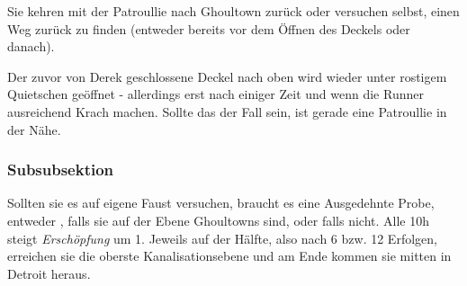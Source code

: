 Sie kehren mit der Patroullie nach Ghoultown zurück oder versuchen selbst, einen Weg zurück zu finden (entweder bereits vor dem Öffnen des Deckels oder danach). 

Der zuvor von Derek geschlossene Deckel nach oben wird wieder unter rostigem Quietschen geöffnet - allerdings erst nach einiger Zeit und wenn die Runner ausreichend Krach machen. Sollte das der Fall sein, ist gerade eine Patroullie in der Nähe.

\subsubsection{Subsubsektion}
Sollten sie es auf eigene Faust versuchen, braucht es eine Ausgedehnte Probe, entweder , falls sie auf der Ebene Ghoultowns sind, oder  falls nicht. Alle 10h steigt \emph{Erschöpfung} um 1. Jeweils auf der Hälfte, also nach 6 bzw. 12 Erfolgen, erreichen sie die oberste Kanalisationsebene und am Ende kommen sie mitten in Detroit heraus. 
